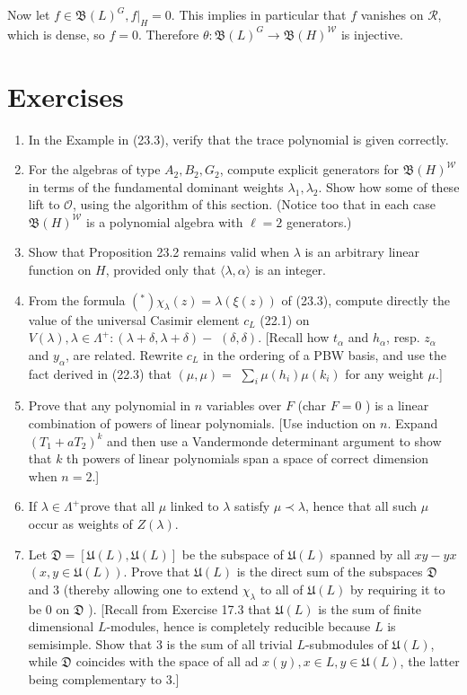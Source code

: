 \documentclass[10pt]{article}
\begin{document}
Now let $f \in \mathfrak{B}(L)^{G},\left.f\right|_{H}=0$. This implies in particular that $f$ vanishes on $\mathscr{R}$, which is dense, so $f=0$. Therefore $\theta: \mathfrak{B}(L)^{G} \rightarrow \mathfrak{B}(H)^{\mathscr{W}}$ is injective.

\section*{Exercises}
\begin{enumerate}
  \item In the Example in (23.3), verify that the trace polynomial is given correctly.
  \item For the algebras of type $A_{2}, B_{2}, G_{2}$, compute explicit generators for $\mathfrak{B}(H)^{\mathscr{W}}$ in terms of the fundamental dominant weights $\lambda_{1}, \lambda_{2}$. Show how some of these lift to $\mathcal{O}$, using the algorithm of this section. (Notice too that in each case $\mathfrak{B}(H)^{\mathscr{W}}$ is a polynomial algebra with $\ell=2$ generators.)
  \item Show that Proposition 23.2 remains valid when $\lambda$ is an arbitrary linear function on $H$, provided only that $\langle\lambda, \alpha\rangle$ is an integer.
  \item From the formula $\left({ }^{*}\right) \chi_{\lambda}(z)=\lambda(\xi(z))$ of (23.3), compute directly the value of the universal Casimir element $c_{L}$ (22.1) on $V(\lambda), \lambda \in \Lambda^{+}:(\lambda+\delta, \lambda+\delta)-$ $(\delta, \delta)$. [Recall how $t_{\alpha}$ and $h_{\alpha}$, resp. $z_{\alpha}$ and $y_{\alpha}$, are related. Rewrite $c_{L}$ in the ordering of a PBW basis, and use the fact derived in (22.3) that $(\mu, \mu)=$ $\sum_{i} \mu\left(h_{i}\right) \mu\left(k_{i}\right)$ for any weight $\mu$.]
  \item Prove that any polynomial in $n$ variables over $F$ (char $F=0$ ) is a linear combination of powers of linear polynomials. [Use induction on $n$. Expand $\left(T_{1}+a T_{2}\right)^{k}$ and then use a Vandermonde determinant argument to show that $k$ th powers of linear polynomials span a space of correct dimension when $n=2$.]
  \item If $\lambda \in \Lambda^{+}$prove that all $\mu$ linked to $\lambda$ satisfy $\mu \prec \lambda$, hence that all such $\mu$ occur as weights of $Z(\lambda)$.
  \item Let $\mathfrak{D}=[\mathfrak{U}(L), \mathfrak{U}(L)]$ be the subspace of $\mathfrak{U}(L)$ spanned by all $x y-y x$ $(x, y \in \mathfrak{U}(L))$. Prove that $\mathfrak{U}(L)$ is the direct sum of the subspaces $\mathfrak{D}$ and 3 (thereby allowing one to extend $\chi_{\lambda}$ to all of $\mathfrak{U}(L)$ by requiring it to be 0 on $\mathfrak{D}$ ). [Recall from Exercise 17.3 that $\mathfrak{U}(L)$ is the sum of finite dimensional $L$-modules, hence is completely reducible because $L$ is semisimple. Show that 3 is the sum of all trivial $L$-submodules of $\mathfrak{U}(L)$, while $\mathfrak{D}$ coincides with the space of all ad $x(y), x \in L, y \in \mathfrak{U}(L)$, the latter being complementary to 3.]

\end{enumerate}
\end{document}

